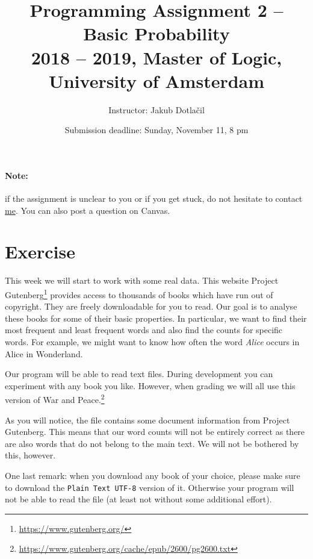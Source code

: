 \documentclass[11pt, a4paper]{article}
\title{Programming Assignment 2 -- Basic Probability \\[2mm]
\large{2018 -- 2019, Master of Logic, University of Amsterdam}}
\author{Instructor: Jakub Dotla\v{c}il}
\date{Submission deadline: Sunday, November 11, 8 pm}
\newcommand{\link}[1]{\footnote{\color{blue}\href{#1}{#1}}}
\begin{document}
\maketitle

\paragraph{Note:} if the assignment is unclear to you or if you get stuck, do not hesitate to contact \href{mailto:j.dotlacil@uva.nl}{me}. You can also post a question on Canvas.

\section{Exercise}
This week we will start to work with some real data. This website Project Gutenberg\link{https://www.gutenberg.org/} provides access to thousands of
books which have run out of copyright. They are freely downloadable for you to read. Our goal is to analyse these books for some of their basic 
properties. In particular, we want to find their most frequent and least frequent words and also find the counts for specific words. For example,
we might want to know how often the word \textit{Alice} occurs in Alice in Wonderland.

Our program will be able to read text files. During development you can experiment
with any book you like. However, when grading we will all use this version of War and Peace.\link{https://www.gutenberg.org/cache/epub/2600/pg2600.txt}

As you will notice, the file contains some document information from Project Gutenberg. This means that our word counts will not be entirely correct as
there are also words that do not belong to the main text. We will not be bothered by this, however.

One last remark: when you download any book of your choice, please make sure to download the \texttt{Plain Text UTF-8} version of it. Otherwise your
program will not be able to read the file (at least not without some additional effort).
\end{document}
